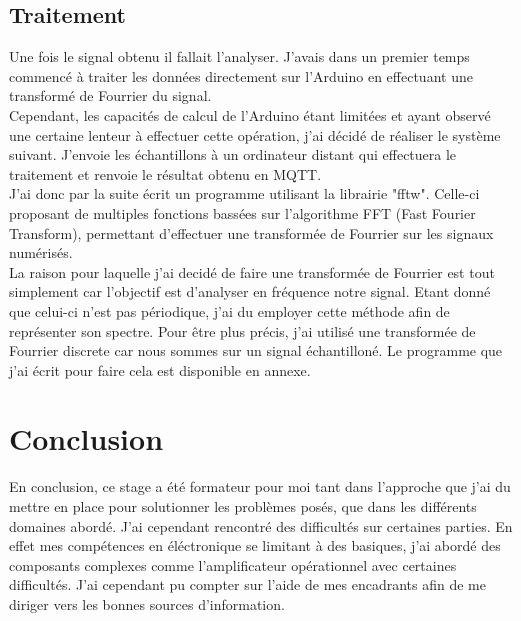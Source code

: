 \documentclass[12pt,french,a4paper]{article}
\begin{document}
\subsection{Traitement}

Une fois le signal obtenu il fallait l'analyser. J'avais dans un premier temps commencé à traiter les données directement sur l'Arduino en effectuant une transformé de Fourrier du signal.\\ 
Cependant, les capacités de calcul de l'Arduino étant limitées et ayant observé une certaine lenteur à effectuer cette opération, j'ai décidé de réaliser le système suivant. J'envoie les échantillons à un ordinateur distant qui effectuera le traitement et renvoie le résultat obtenu en MQTT.\\
J'ai donc par la suite écrit un programme utilisant la librairie "fftw". Celle-ci proposant de multiples fonctions bassées sur l'algorithme FFT (Fast Fourier Transform), permettant d'effectuer une transformée de Fourrier sur les signaux numérisés.\\
La raison pour laquelle j'ai decidé de faire une transformée de Fourrier est tout simplement car l'objectif est d'analyser en fréquence notre signal. Etant donné que celui-ci n'est pas périodique, j'ai du employer cette méthode afin de représenter son spectre. Pour être plus précis, j'ai utilisé une transformée de Fourrier discrete car nous sommes sur un signal échantilloné. 
Le programme que j'ai écrit pour faire cela est disponible en annexe. 


\newpage
\section{Conclusion}
En conclusion, ce stage a été formateur pour moi tant dans l'approche que j'ai du mettre en place pour solutionner les problèmes posés, que dans les différents domaines abordé. J'ai cependant rencontré des difficultés sur certaines parties. En effet mes compétences en éléctronique se limitant à des basiques, j'ai abordé des composants complexes comme l'amplificateur opérationnel avec certaines difficultés. J'ai cependant pu compter sur l'aide de mes encadrants afin de me diriger vers les bonnes sources d'information.


\newpage
\listoffigures
\newpage

\end{document}
